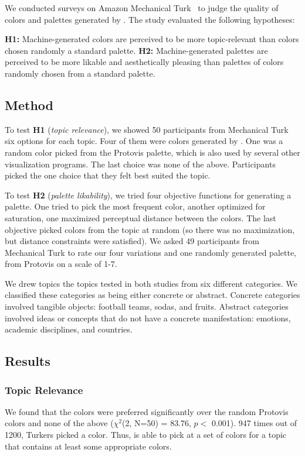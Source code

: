 We conducted surveys on Amazon Mechanical Turk~\cite{mturk} to judge the quality of colors and palettes generated by \system. The study evaluated the following hypotheses:

\textbf{H1:} Machine-generated colors are perceived to be more topic-relevant than colors chosen randomly a standard palette.
\textbf{H2:} Machine-generated palettes are perceived to be more likable and aesthetically pleasing than palettes of colors randomly chosen from a standard palette. 

\subsection{Method}
To test \textbf{H1} (\textit{topic relevance}), we showed 50 participants from Mechanical Turk six options for each topic. Four of them were colors generated by \system. One was a random color picked from the Protovis palette, which is also used by several other visualization programs. The last choice was none of the above. Participants picked the one choice that they felt best suited the topic.

To test \textbf{H2} (\textit{palette likability}), we tried four objective functions for generating a palette. One tried to pick the most frequent color, another optimized for saturation, one maximized perceptual distance between the colors. The last objective picked colors from the topic at random (so there was no maximization, but distance constraints were satisfied). We asked 49 participants from Mechanical Turk to rate our four variations and one randomly generated palette, from Protovis on a scale of 1-7.

We drew topics the topics tested in both studies from six different categories. We classified these categories as being either concrete or abstract. Concrete categories involved tangible objects: football teams, sodas, and fruits. Abstract categories involved ideas or concepts that do not have a concrete manifestation: emotions, academic disciplines, and countries. 

\subsection{Results}
\subsubsection{Topic Relevance} 
We found that the \system colors were preferred significantly over the random Protovis colors and none of the above ($\chi^2$(2, N=50) = 83.76, $p <$ 0.001). 947 times out of 1200, Turkers picked a \system color.  Thus, \system is able to pick at a set of colors for a topic that contains at least some appropriate colors.

